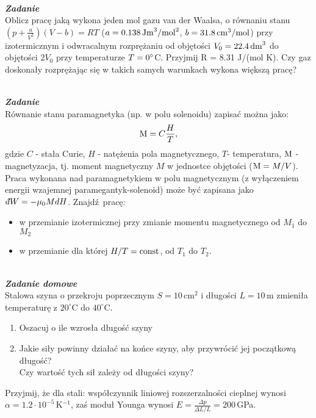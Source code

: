 \documentclass[11pt,a4paper]{article}
\newcounter{zadanie}\newcommand{\zadanie}[1][]{\addtocounter{zadanie}{1} ~\\  {\bf \emph{Zadanie \arabic{zadanie} #1 }} \\}
\newcounter{zaddom}\newcommand{\zaddom}[1][]{\addtocounter{zaddom}{1} ~\\  {\bf \emph{Zadanie domowe \arabic{zaddom} #1 }} \\}
\newcommand{\dbar}{{\mkern3mu\mathchar'26\mkern-12mu d}}
\renewcommand{\t}[1]{\textrm{#1}}
\begin{document}
\vskip 10pt

\zadanie
Oblicz pracę jaką wykona jeden mol gazu van der Waalsa, o równaniu stanu
$(p+\frac{a}{V^2})(V-b)=RT$
($a=0.138\,\rm{Jm}^3/\rm{mol}^2$, $b=31.8\,\rm{cm^3/mol}$)
przy izotermicznym i odwracalnym rozprężaniu od objętości $V_0=22.4\,\rm{dm}^3$
do objętości $2 V_0$ przy temperaturze $T=0\degree$C. 
Przyjmij R = 8.31 J/(mol K).
Czy gaz doskonały rozprężając się w takich samych warunkach wykona większą pracę?

\vskip 10pt

\zadanie
Równanie stanu paramagnetyka (np. w polu solenoidu) zapisać można jako:
\[  {\rm M}= C \frac{H}{T}, \]
gdzie $C$ - stała Curie, $H$ - natężenia pola magnetycznego, $T$- temperatura,
$\rm M$ - magnetyzacja, tj. moment magnetyczny $M$ w jednostce objętości (${\rm M}=M/V$).
Praca wykonana nad paramagnetykiem w polu magnetycznym
 (z wyłączeniem energii wzajemnej paramegantyk-solenoid) może być zapisana jako
 $\dbar W = -\mu_0 M dH$.
Znajdź pracę: 
\begin{itemize}
\item w przemianie izotermicznej przy zmianie momentu magnetycznego od $M_1$ do $M_2$
\item w przemianie dla której $H/T={\rm const}$, od $T_1$ do $T_2$. 
\end{itemize}


\pagebreak
\zaddom
Stalowa szyna o przekroju poprzecznym $S = 10\,$cm$^2$ i długości $L = 10\,$m zmieniła temperaturę
z $20^\circ$C do $40^\circ$C.
\begin{enumerate}
\item Oszacuj o ile wzrosła długość szyny
\item Jakie siły powinny działać na końce szyny, aby przywrócić jej początkową długość? \\
      Czy wartość tych sił zależy od długości szyny?
\end{enumerate}
Przyjmij, że dla stali: współczynnik liniowej rozszerzalności cieplnej wynosi $\alpha = 1.2\cdot 10^{-5}\,$K$^{-1}$,
zaś moduł Younga wynosi $\displaystyle E = \frac{\Delta p}{\Delta L/L} = 200\,$GPa.
\end{document}

